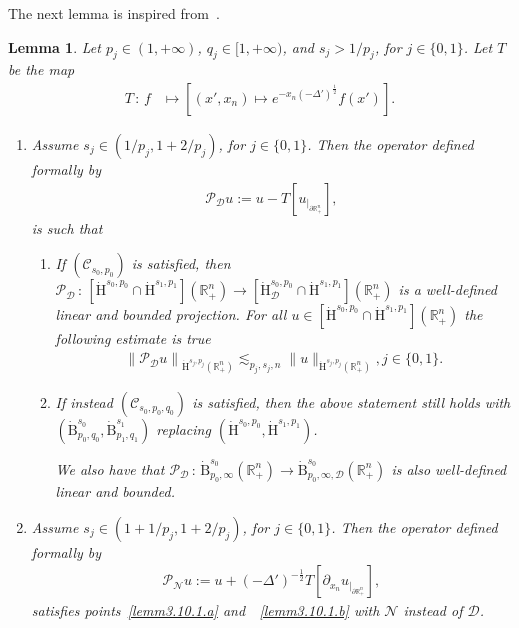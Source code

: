 \documentclass[10pt]{amsart}
\newtheorem{lemm}[theo]{Lemma}\newtheorem{prop}[theo]{Proposition}\newtheorem{coro}[theo]{Corollary}\newtheorem{conj}[theo]{Conjecture}
\theoremstyle{definition}\newtheorem{defi}[theo]{Definition}\newtheorem{rema}[theo]{Remark}\newtheorem{exam}[theo]{Example}\newtheorem{exem}[theo]{Example}\newtheorem{nota}[theo]{Notation}
\newcommand{\bbR}{\mathbb{R}}
\newcommand{\rmH}{\mathrm{H}}%
\newcommand{\rmB}{\mathrm{B}}
\newcommand{\clC}{\mathcal{C}}
\newcommand{\clN}{\mathcal{N}}
\newcommand{\clD}{\mathcal{D}}
\newcommand{\clP}{\mathcal{P}}
\newcommand*{\romanenumi}{\renewcommand*{\theenumi}{\roman{enumi}}}
\begin{document}
The next lemma is inspired from~\cite[Lemma~2.4]{Guidetti1991Interp}.

\begin{lemm}\label{lem:ProjectDirNeuBC}
Let $p_j\in(1,+\infty)$, $q_j\in[1,+\infty)$, and $s_j>1/p_j$, for $j\in\{ 0,1\}$. Let $T$ be the map
\begin{align*}
T\,:\,f & \longmapsto \left[(x',x_n)\mapsto e^{-x_n(-\Delta')^\frac{1}{2}}f(x') \right] .
\end{align*}
\begin{enumerate}\romanenumi
\item\label{lemm3.10.1} Assume $s_j\in(1/p_j,1+2/p_j)$, for $j\in\{0,1\}$. Then the operator defined formally by
\begin{align*}
\clP _{\clD} u:= u - T\left[u_{|_{\partial\bbR^n_+}}\right],
\end{align*}
is such that
\begin{enumerate}
\item\label{lemm3.10.1.a} If $(\clC_{s_0,p_0})$ is satisfied, then $\clP _{\clD} \,:\,[\dot{\rmH}^{s_0,p_0}\cap\dot{\rmH}^{s_1,p_1}](\bbR^n_+) \longrightarrow [\dot{\rmH}^{s_0,p_0}_{\clD}\cap\dot{\rmH}^{s_1,p_1}](\bbR^n_+)$ is a well-defined linear and bounded projection. For all $u\in [\dot{\rmH}^{s_0,p_0}\cap\dot{\rmH}^{s_1,p_1}](\bbR^n_+)$ the following estimate is true
\begin{align*}
\left\| \clP _{\clD} u \right\|_{\dot{\rmH}^{s_j,p_j}\left(\bbR^n_+\right)} \lesssim_{p_j,s_j,n} \| u \|_{\dot{\rmH}^{s_j,p_j}\left(\bbR^n_+\right)}, j\in\{0,1\} .
\end{align*}
\item\label{lemm3.10.1.b} If instead $(\clC_{s_0,p_0,q_0})$ is satisfied, then the above statement still holds with $(\dot{\rmB}^{s_0}_{p_0,q_0},\dot{\rmB}^{s_1}_{p_1,q_1})$ replacing $(\dot{\rmH}^{s_0,p_0},\dot{\rmH}^{s_1,p_1})$.

We also have that $\clP _{\clD}\,:\,\dot{\rmB}^{s_0}_{p_0,\infty}(\bbR^n_+)\longrightarrow \dot{\rmB}^{s_0}_{p_0,\infty,\clD}(\bbR^n_+)$ is also well-defined linear and bounded.
\end{enumerate}
\item\label{lemm3.10.2} Assume $s_j\in(1+1/p_j,1+2/p_j)$, for $j\in\{0,1\}$. Then the operator defined formally by
\begin{align*}
\clP _{\clN} u:= u + (-\Delta')^{-\frac{1}{2}}T\left[\partial_{x_n}u_{|_{\partial\bbR^n_+}}\right],
\end{align*}
satisfies points~\eqref{lemm3.10.1.a} and~~\eqref{lemm3.10.1.b} with $\clN$ instead of $\clD$.
\end{enumerate}
\end{lemm}
\end{document}
